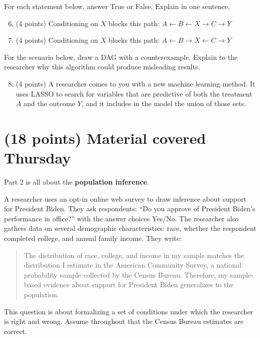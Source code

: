 \documentclass[10pt]{article}
\begin{document}

For each statement below, answer True or False. Explain in one sentence.
\begin{enumerate}
    \setcounter{enumi}{5}
    \item (4 points) Conditioning on $X$ blocks this path: $A\leftarrow B \leftarrow X \rightarrow C \rightarrow Y$
    \item (4 points) Conditioning on $X$ blocks this path: $A\leftarrow B \rightarrow X \leftarrow C \rightarrow Y$
\end{enumerate}

For the scenario below, draw a DAG with a counterexample. Explain to the researcher why this algorithm could produce misleading results.
\begin{enumerate}
    \setcounter{enumi}{7}
    \item (4 points) A researcher comes to you with a new machine learning method. It uses LASSO to search for variables that are predictive of both the treatment $A$ and the outcome $Y$, and it includes in the model the union of those sets. 
\end{enumerate}


\section{(18 points) Material covered Thursday}
Part 2 is all about the \textbf{population inference}.

A researcher uses an opt-in online web survey to draw inference about support for President Biden. They ask respondents: ``Do you approve of President Biden's performance in office?'' with the answer choices Yes/No. The researcher also gathers data on several demographic characteristics: race, whether the respondent completed college, and annual family income. They write:
\begin{quote}
    The distribution of race, college, and income in my sample matches the distribution I estimate in the American Community Survey, a national probability sample collected by the Census Bureau. Therefore, my sample-based evidence about support for President Biden generalizes to the population.
\end{quote}
This question is about formalizing a set of conditions under which the researcher is right and wrong. Assume throughout that the Census Bureau estimates are correct.
\end{document}
